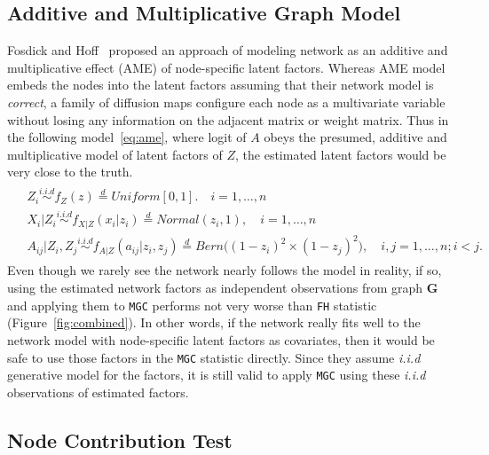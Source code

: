 \documentclass[11pt]{article}
\theoremstyle{definition}
\begin{document}
\subsection{Additive and Multiplicative Graph Model}
\label{ssec:ame}

Fosdick and Hoff~\cite{fosdick2015testing} proposed an approach of modeling network as an additive and multiplicative effect (AME) of node-specific latent factors. Whereas AME model embeds the nodes into the latent factors assuming that their network model is \textit{correct}, a family of diffusion maps configure each node as a multivariate variable without losing any information on the adjacent matrix or weight matrix. Thus in the following model~\ref{eq:ame}, where logit of $A$ obeys the presumed, additive and multiplicative model of latent factors of $Z$, the estimated latent factors would be very close to the truth. 
\begin{equation}
\label{eq:ame}
\begin{gathered}
\begin{aligned}
&	Z_{i} \overset{i.i.d}{\sim} f_{Z}(z) \stackrel{d}{=} Uniform[0,1]. \quad i = 1, \ldots, n \\ 
&	X_{i} | Z_{i} \overset{i.i.d}{\sim}  f_{X|Z}(x_{i} | z_{i}) \stackrel{d}{=}  Normal(z_{i}, 1), \quad i= 1, \ldots, n \\
&	A_{ij} | Z_{i}, Z_{j} \overset{i.i.d}{\sim}  f_{A|Z}(a_{ij} | z_{i}, z_{j}) \stackrel{d}{=}   Bern \big(  ( 1 - z_{i})^2 \times (1 - z_{j})^2    \big), \quad i,j = 1, \ldots, n;  i < j.
\end{aligned}
\end{gathered}
\end{equation}	
Even though we rarely see the network nearly follows the model in reality, if so, using the estimated network factors as independent observations from graph \textbf{G} and applying them to \texttt{MGC} performs not very worse than \texttt{FH} statistic (Figure~\ref{fig:combined}). In other words, if the network really fits well to the network model with node-specific latent factors as covariates, then it would be safe to use those factors in the \texttt{MGC} statistic directly. Since they assume \textit{i.i.d} generative model for the factors, it is still valid to apply \texttt{MGC} using these \textit{i.i.d} observations of estimated factors.

\subsection{Node Contribution Test}
\label{ssec:node}
\end{document}
